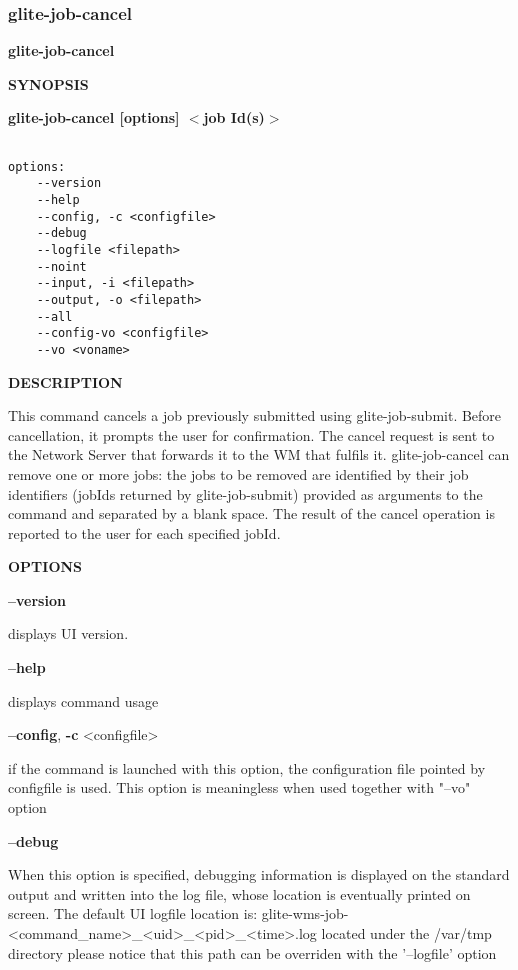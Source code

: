 \subsubsection{glite-job-cancel}
\label{glite-job-cancel}

\medskip
\textbf{glite-job-cancel}
\smallskip


\medskip
\textbf{SYNOPSIS}
\smallskip

\textbf{glite-job-cancel [options]  $<$job Id(s)$>$}
{\begin{verbatim}

options:
	--version
	--help
	--config, -c <configfile>
	--debug
	--logfile <filepath>
	--noint
	--input, -i <filepath>
	--output, -o <filepath>
	--all
	--config-vo <configfile>
	--vo <voname>
\end{verbatim}

\medskip
\textbf{DESCRIPTION}
\smallskip


This command cancels a job previously submitted using glite-job-submit. Before cancellation, it prompts the user for confirmation.
The cancel request is sent to the Network Server that forwards it to the WM that fulfils it.
glite-job-cancel can remove one or more jobs: the jobs to be removed are identified by their job identifiers (jobIds returned by glite-job-submit) provided as arguments to the command and separated by a blank space.
The result of the cancel operation is reported to the user for each specified jobId.

\medskip
\textbf{OPTIONS}
\smallskip

\textbf{--version}

displays UI version.

\textbf{--help}

displays command usage

\textbf{--config}, \textbf{-c} <configfile>

if the command is launched with this option, the configuration file pointed by configfile is used. This option is meaningless when used together with "--vo" option

\textbf{--debug}

When this option is specified, debugging information is displayed on the standard output and written into the log file, whose location is eventually printed on screen.
The default UI logfile location is:
glite-wms-job-<command\_name>\_<uid>\_<pid>\_<time>.log  located under the /var/tmp directory
please notice that this path can be overriden with the '--logfile' option

}
